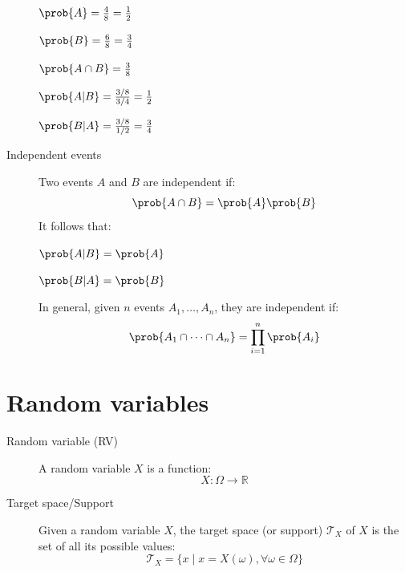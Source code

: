 \begin{description}
\begin{example}
            \begin{minipage}{.325\linewidth}
                \centering
                $\prob{A} = \frac{4}{8} = \frac{1}{2}$
            \end{minipage}
            \begin{minipage}{.325\linewidth}
                \centering
                $\prob{B} = \frac{6}{8} = \frac{3}{4}$
            \end{minipage}
            \begin{minipage}{.325\linewidth}
                \centering
                $\prob{A \cap B} = \frac{3}{8}$
            \end{minipage}

            \begin{minipage}{.48\linewidth}
                \centering
                $\prob{A \vert B} = \frac{3/8}{3/4} = \frac{1}{2}$
            \end{minipage}
            \begin{minipage}{.48\linewidth}
                \centering
                $\prob{B \vert A} = \frac{3/8}{1/2} = \frac{3}{4}$
            \end{minipage}
        \end{example}

    \item[Independent events] 
        Two events $A$ and $B$ are independent if:
        \[ \prob{A \cap B} = \prob{A}\prob{B} \]
        It follows that:

        \begin{minipage}{.48\linewidth}
            \centering
            $\prob{A \vert B} = \prob{A}$
        \end{minipage}
        \begin{minipage}{.48\linewidth}
            \centering
            $\prob{B \vert A} = \prob{B}$
        \end{minipage}

        In general, given $n$ events $A_1, \dots, A_n$, they are independent if:
        \[ \prob{A_1 \cap \dots \cap A_n} = \prod_{i=1}^{n} \prob{A_i} \]
\end{description}



\section{Random variables}
\begin{description}
    \item[Random variable (RV)] 
        A random variable $X$ is a function:
        \[ X: \Omega \rightarrow \mathbb{R} \]

    \item[Target space/Support] 
        Given a random variable $X$, 
        the target space (or support) $\mathcal{T}_X$ of $X$ is the set of all its possible values:
        \[ \mathcal{T}_X = \{ x \mid x = X(\omega), \forall \omega \in \Omega \} \]
\end{description}


